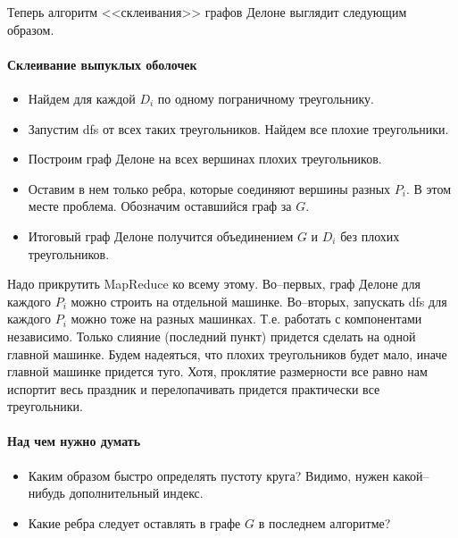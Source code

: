 \documentclass{article}
\begin{document}
    	Теперь алгоритм <<склеивания>> графов Делоне выглядит следующим образом. 
    	\paragraph{Склеивание выпуклых оболочек\\}
        \begin{itemize}
            \item Найдем для каждой $D_i$ по одному пограничному треугольнику.
            \item Запустим dfs от всех таких треугольников. Найдем все плохие треугольники.
            \item Построим граф Делоне на всех вершинах плохих треугольников.
            \item Оставим в нем только ребра, которые соединяют вершины разных $P_i$. В этом месте проблема. Обозначим оставшийся граф за $G$. 
            \item Итоговый граф Делоне получится объединением $G$ и $D_i$ без плохих треугольников.
        \end{itemize}
    	
    	Надо прикрутить MapReduce ко всему этому. Во--первых, граф Делоне для каждого $P_i$ можно строить на отдельной машинке. Во--вторых, запускать dfs для каждого $P_i$ можно тоже на разных машинках. Т.е. работать с компонентами независимо. Только слияние (последний пункт) придется сделать на одной главной машинке. Будем надеяться, что плохих треугольников будет мало, иначе главной машинке придется туго. Хотя, проклятие размерности все равно нам испортит весь праздник и перелопачивать придется практически все треугольники.          
	    
    \paragraph{Над чем нужно думать}
        \begin{itemize}
            \item Каким образом быстро определять пустоту круга? Видимо, нужен какой--нибудь дополнительный индекс. 
	        \item Какие ребра следует оставлять в графе $G$ в последнем алгоритме?
        \end{itemize}
        
	
\end{document}

